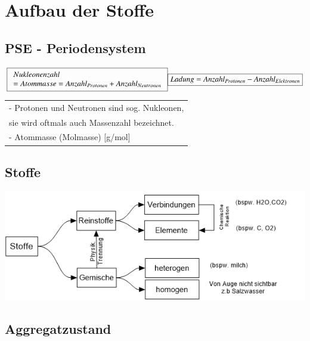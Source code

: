 \section{Aufbau der Stoffe}

\subsection{PSE - Periodensystem}

\begin{minipage}[c]{0.4\columnwidth}
	\begin{flushleft}
		\small
		{$\boxed{ \begin{array} {l} Nukleonenzahl \\ = Atommasse = Anzahl_{Protonen} + Anzahl_{Neutronen} \end{array}} \newline
		\boxed{Ladung = Anzahl_{Protonen} - Anzahl_{Elektronen}}$}
	\end{flushleft}

\end{minipage}
\hfill
\begin{minipage}[c]{0.6\columnwidth}
	\tiny{	\begin{flushright}
			\begin{tabular}{l}
				- Protonen und Neutronen sind sog. Nukleonen, \\
				sie wird oftmals auch Massenzahl bezeichnet.  \\
				- Atommasse (Molmasse) [g/mol]
			\end{tabular}
		\end{flushright}
	}
\end{minipage}

\subsection{Stoffe}	
\includegraphics[width=\columnwidth]{images/Stoffe_RM.png}
\renewcommand{\arraystretch}{1.0}

\subsection{Aggregatzustand}		

